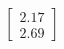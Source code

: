 \documentclass[preview]{standalone}
\begin{document}
\begin{align*}
\begin{bmatrix} 2.17 \\ 2.69 \end{bmatrix}
\end{align*}
\end{document}

